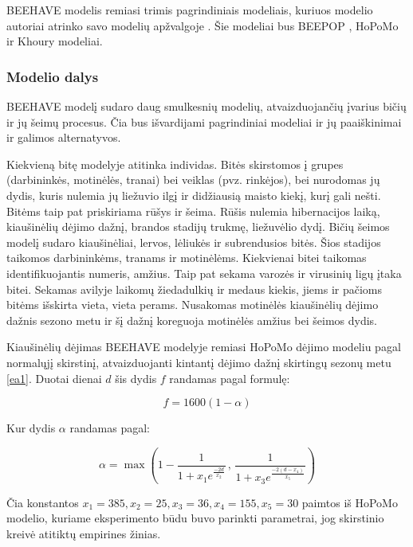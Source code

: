 \documentclass{VUMIFKompMagistrinis}
\begin{document}
BEEHAVE modelis remiasi trimis pagrindiniais modeliais, kuriuos modelio autoriai atrinko savo modelių apžvalgoje \cite{BTO13}. Šie modeliai bus BEEPOP \cite{DRL89} , HoPoMo \cite{ScC07} ir Khoury \cite{KBM13} modeliai. 

\subsubsection{Modelio dalys}

BEEHAVE modelį sudaro daug smulkesnių modelių, atvaizduojančių įvarius bičių ir jų šeimų procesus. Čia bus išvardijami pagrindiniai modeliai ir jų paaiškinimai ir galimos alternatyvos.


Kiekvieną bitę modelyje atitinka individas. Bitės skirstomos į grupes (darbininkės, motinėlės, tranai) bei veiklas (pvz. rinkėjos), bei nurodomas jų dydis, kuris nulemia jų liežuvio ilgį ir didžiausią maisto kiekį, kurį gali nešti. Bitėms taip pat priskiriama rūšys ir šeima. Rūšis nulemia hibernacijos laiką, kiaušinėlių dėjimo dažnį, brandos stadijų trukmę, liežuvėlio dydį.
Bičių šeimos modelį sudaro kiaušinėliai, lervos, lėliukės ir subrendusios bitės. Šios stadijos taikomos darbininkėms, tranams ir motinėlėms. Kiekvienai bitei taikomas identifikuojantis numeris, amžius. Taip pat sekama varozės ir virusinių ligų įtaka bitei. Sekamas avilyje laikomų žiedadulkių ir medaus kiekis, jiems ir pačioms bitėms išskirta vieta, vieta perams. Nusakomas motinėlės kiaušinėlių dėjimo dažnis sezono metu ir šį dažnį koreguoja motinėlės amžius bei šeimos dydis. 

Kiaušinėlių dėjimas BEEHAVE modelyje remiasi HoPoMo dėjimo modeliu pagal normalųjį skirstinį, atvaizduojanti kintantį dėjimo dažnį skirtingų sezonų metu \eqref{ea1}. Duotai dienai $d$ šis dydis $f$ randamas pagal formulę:


\begin{equation}\label{ef1}
f=1600(1-\alpha)
\end{equation}

Kur dydis $\alpha$ randamas pagal:

\begin{equation}\label{ea1}
\alpha= \max(1-\frac{1}{1+x_1e^\frac{-2d}{x_2}}\,,\,\frac{1}{1+x_3e^\frac{-2(d-x_4)}{x_5}})
\end{equation}


Čia konstantos $x_1=385, x_2=25, x_3=36, x_4=155, x_5=30$ paimtos iš HoPoMo modelio, kuriame eksperimento būdu buvo parinkti parametrai, jog skirstinio kreivė atitiktų empirines žinias.
\end{document}
